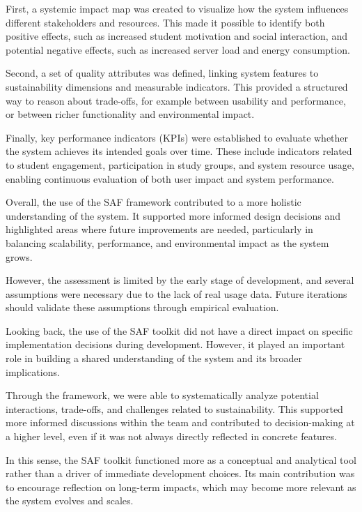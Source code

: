 First, a systemic impact map was created to visualize how the system influences different
stakeholders and resources.
This made it possible to identify both positive effects,
such as increased student motivation and social interaction, and potential negative effects,
such as increased server load and energy consumption.

Second, a set of quality attributes was defined, linking system features to sustainability
dimensions and measurable indicators.
This provided a structured way to reason about trade-offs,
for example between usability and performance, or between richer functionality and environmental impact.

Finally, key performance indicators (KPIs) were established to evaluate whether the system
achieves its intended goals over time.
These include indicators related to student engagement,
participation in study groups, and system resource usage,
enabling continuous evaluation of both user impact and system performance.

Overall, the use of the SAF framework contributed to a more holistic understanding of the system.
It supported more informed design decisions and highlighted areas where future improvements are needed,
particularly in balancing scalability, performance, and environmental impact as the system grows.

However, the assessment is limited by the early stage of development,
and several assumptions were necessary due to the lack of real usage data.
Future iterations should validate these assumptions through empirical evaluation.

Looking back, the use of the SAF toolkit did not have a direct impact on specific implementation decisions during development.
However, it played an important role in building a shared understanding of the system and its broader implications.

Through the framework, we were able to systematically analyze potential interactions,
trade-offs, and challenges related to sustainability.
This supported more informed discussions within the team and contributed to decision-making at a higher level,
even if it was not always directly reflected in concrete features.

In this sense, the SAF toolkit functioned more as a conceptual and analytical tool
rather than a driver of immediate development choices.
Its main contribution was to encourage reflection on long-term impacts,
which may become more relevant as the system evolves and scales.

